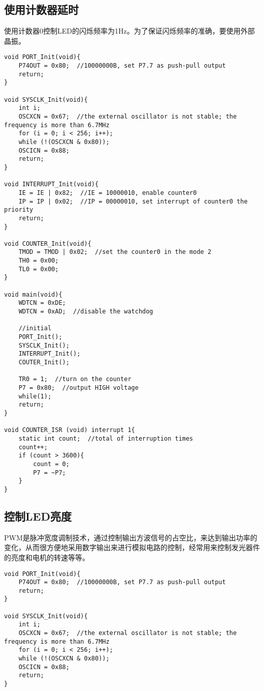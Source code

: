 \begin{spacing}{1.3}
\subsection{使用计数器延时}

使用计数器0控制LED的闪烁频率为1Hz。为了保证闪烁频率的准确，要使用外部晶振。

\begin{lstlisting}
void PORT_Init(void){
	P74OUT = 0x80;  //10000000B, set P7.7 as push-pull output
	return;
}

void SYSCLK_Init(void){
	int i;
	OSCXCN = 0x67;  //the external oscillator is not stable; the frequency is more than 6.7MHz
	for (i = 0; i < 256; i++);
	while (!(OSCXCN & 0x80));
	OSCICN = 0x88;
	return;
}

void INTERRUPT_Init(void){
	IE = IE | 0x82;  //IE = 10000010, enable counter0
	IP = IP | 0x02;  //IP = 00000010, set interrupt of counter0 the priority
	return;
}

void COUNTER_Init(void){
	TMOD = TMOD | 0x02;  //set the counter0 in the mode 2
	TH0 = 0x00;
	TL0 = 0x00;
}

void main(void){
	WDTCN = 0xDE;
	WDTCN = 0xAD;  //disable the watchdog

	//initial
	PORT_Init();
	SYSCLK_Init();
	INTERRUPT_Init();
	COUTER_Init();

	TR0 = 1;  //turn on the counter
	P7 = 0x80;  //output HIGH voltage
	while(1);
	return;
}

void COUNTER_ISR (void) interrupt 1{
	static int count;  //total of interruption times
	count++;
	if (count > 3600){
		count = 0;
		P7 = ~P7;
	}
}
\end{lstlisting}

\subsection{控制LED亮度}

PWM是脉冲宽度调制技术，通过控制输出方波信号的占空比，来达到输出功率的变化，从而很方便地采用数字输出来进行模拟电路的控制，经常用来控制发光器件的亮度和电机的转速等等。

\begin{lstlisting}
void PORT_Init(void){
	P74OUT = 0x80;  //10000000B, set P7.7 as push-pull output
	return;
}

void SYSCLK_Init(void){
	int i;
	OSCXCN = 0x67;  //the external oscillator is not stable; the frequency is more than 6.7MHz
	for (i = 0; i < 256; i++);
	while (!(OSCXCN & 0x80));
	OSCICN = 0x88;
	return;
}


\end{lstlisting}
\end{spacing}
